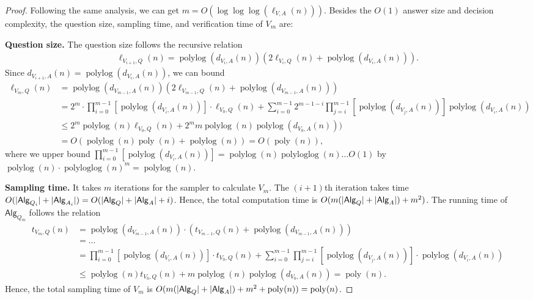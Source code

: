 \documentclass[10pt,a4paper]{article}
\theoremstyle{plain}
\theoremstyle{definition}
\DeclarePairedDelimiter{\abs}{\lvert}{\rvert}
\newcommand{\poly} {\ensuremath{\operatorname{poly}}}
\newcommand{\polylog} {\ensuremath{\operatorname{polylog}}}
\newcommand{\polyloglog} {\ensuremath{\operatorname{polyloglog}}}
\newcommand{\1}{\mathbb{1}} %
\newcommand{\Alg}{\mathsf{Alg}}
\begin{document}
\begin{proof}
Following the same analysis, we can get $m = O(\log\log\log(\ell_{V,A}(n)))$.
Besides the $O(1)$ answer size and decision complexity, the question size, sampling time, and verification time of $V_m$ are:

\textbf{Question size.} The question size follows the recursive relation 
\begin{align*}
    \ell_{V_{i+1},Q}(n) =  \polylog(d_{V_i,A}(n))(2 \ell_{V_i, Q}(n) +  \polylog(d_{V_i,A}(n))).
\end{align*}
Since $d_{V_{i+1},A}(n) = \polylog(d_{V_i,A}(n))$, we can bound 
\begin{align*}
    \ell_{V_m, Q}(n) &= \polylog(d_{V_{m-1},A}(n))(2 \ell_{V_{m-1},Q}(n) + \polylog(d_{V_{m-1},A}(n))) \\
    &= 2^m \cdot \prod_{i=0}^{m-1} [\polylog(d_{V_i,A}(n))] \cdot \ell_{V_0, Q}(n) + \sum_{i=0}^{m-1} 2^{m-1-i} \prod_{j=i}^{m-1} [\polylog(d_{V_j,A}(n))] \polylog(d_{V_i,A}(n)) \\
    &\leq 2^m \polylog(n)\ell_{V_0, Q}(n) + 2^m m \polylog(n) \polylog(d_{V_0,A}(n))) \\
    &= O(\polylog(n) \poly(n) + \polylog(n)) = O(\poly(n)),
\end{align*}
where we upper bound $\prod_{i=0}^{m-1} [\polylog(d_{V_i,A}(n))] = \polylog(n) \polyloglog(n) \ldots O(1)$ by
$\polylog(n) \cdot \polyloglog(n)^m = \polylog(n)$.

\textbf{Sampling time.} It takes $m$ iterations for the sampler to calculate $V_m$. 
The $(i+1)$th iteration takes time $O( \abs{\Alg_{Q_i}}+ \abs{\Alg_{A_i}}) = O(\abs{\Alg_{Q}} + \abs{\Alg_{A}} +i)$.
    Hence, the total computation time is $O( m(\abs{\Alg_{Q}} + \abs{\Alg_{A}}) + m^2)$.
The running time of $\Alg_{Q_m}$ follows the relation
\begin{align*}
    t_{V_m,Q}(n) &= \polylog(d_{V_{m-1},A}(n)) \cdot (t_{V_{m-1},Q}(n) + \polylog(d_{V_{m-1},A}(n))) \\
    &= \ldots \\
    &= \prod_{i=0}^{m-1} [\polylog(d_{V_i,A}(n))] \cdot t_{V_0, Q}(n) + \sum_{i=0}^{m-1} \prod_{j=i}^{m-1} [\polylog(d_{V_j,A}(n))] \cdot 
    \polylog(d_{V_{i},A}(n)) \\
    &\leq \polylog(n) t_{V_0, Q}(n) + m \polylog(n) \polylog(d_{V_0,A}(n)) = \poly(n).
\end{align*}
Hence, the total sampling time of $V_m$ is $O( m(\abs{\Alg_{Q}} + \abs{\Alg_{A}}) + m^2 + \poly(n)) = \poly(n)$.


\end{proof}
\end{document}
